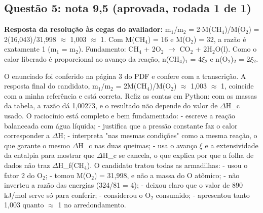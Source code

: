 \documentclass{article}%
\begin{document}
\subsection*{Questão 5: nota 9,5 (aprovada, rodada 1 de 1)}%
\textbf{Resposta da resolução às cegas do avaliador:} m$_{1}$/m$_{2}$ = 2$\cdot$M(CH$_{4}$)/M(O$_{2}$) = 2(16,043)/31,998 $\approx$ 1,003 $\approx$ 1. Com M(CH$_{4}$) = 16 e M(O$_{2}$) = 32, a razão é exatamente 1 (m$_{1}$ = m$_{2}$). Fundamento: CH$_{4}$ + 2O$_{2}$ $\to$ CO$_{2}$ + 2H$_{2}$O(l). Como o calor liberado é proporcional ao avanço da reação, n(CH$_{4}$)$_{1}$ = 4$\xi$$_{2}$ e n(O$_{2}$)$_{2}$ = 2$\xi$$_{2}$.\par %
O enunciado foi conferido na página 3 do PDF e confere com a transcrição. A resposta final do candidato, m$_{1}$/m$_{2}$ = 2M(CH$_{4}$)/M(O$_{2}$) $\approx$ 1,003 $\approx$ 1, coincide com a minha referência e está correta. Refiz as contas em Python: com as massas da tabela, a razão dá 1,00273, e o resultado não depende do valor de $\Delta$H\_c usado.\newline%
\newline%
O raciocínio está completo e bem fundamentado:\newline%
{-} escreve a reação balanceada com água líquida;\newline%
{-} justifica que a pressão constante faz o calor corresponder a $\Delta$H;\newline%
{-} interpreta "nas mesmas condições" como a mesma reação, o que garante o mesmo $\Delta$H\_c nas duas queimas;\newline%
{-} usa o avanço $\xi$ e a extensividade da entalpia para mostrar que $\Delta$H\_c se cancela, o que explica por que a folha de dados não traz $\Delta$H\_f(CH$_{4}$).\newline%
\newline%
O candidato tratou todas as armadilhas:\newline%
{-} usou o fator 2 do O$_{2}$;\newline%
{-} tomou M(O$_{2}$) = 31,998, e não a massa do O atômico;\newline%
{-} não inverteu a razão das energias (324/81 = 4);\newline%
{-} deixou claro que o valor de 890 kJ/mol serve só para conferir;\newline%
{-} considerou o O$_{2}$ consumido;\newline%
{-} apresentou tanto 1,003 quanto $\approx$ 1 no arredondamento.\newline%
\newline%
\end{document}
